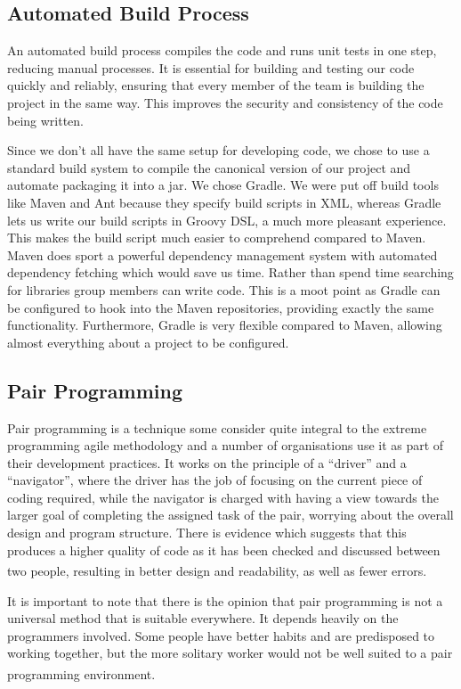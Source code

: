 \documentclass[10pt, a4paper]{article}
\begin{document}
\subsection{Automated Build Process}

An automated build process compiles the code and runs unit tests in one step, reducing manual processes. It is essential for building and testing our code quickly and reliably, ensuring that every member of the team is building the project in the same way. This improves the security and consistency of the code being written. 

Since we don’t all have the same setup for developing code, we chose to use a standard build system to compile the canonical version of our project and automate packaging it into a jar. We chose Gradle. We were put off build tools like Maven and Ant because they specify build scripts in XML, whereas Gradle lets us write our build scripts in Groovy DSL, a much more pleasant experience. This makes the build script much easier to comprehend compared to Maven. Maven does sport a powerful dependency management system with automated dependency fetching which would save us time. Rather than spend time searching for libraries group members can write code. This is a moot point as Gradle can be configured to hook into the Maven repositories, providing exactly the same functionality. Furthermore, Gradle is very flexible compared to Maven, allowing almost everything about a project to be configured. 

\subsection{Pair Programming}

Pair programming is a technique some consider quite integral to the extreme programming agile methodology and a number of organisations use it as part of their development practices. It works on the principle of a “driver” and a “navigator”, where the driver has the job of focusing on the current piece of coding required, while the navigator is charged with having a view towards the larger goal of completing the assigned task of the pair, worrying about the overall design and program structure. There is evidence which suggests that this produces a higher quality of code as it has been checked and discussed between two people, resulting in better design and readability, as well as fewer errors\textsuperscript{\cite{pairprog1a,pairprog1b,pairprog1c,pairprog1d}}.

It is important to note that there is the opinion that pair programming is not a universal method that is suitable everywhere. It depends heavily on the programmers involved. Some people have better habits and are predisposed to working together, but the more solitary worker would not be well suited to a pair programming environment\textsuperscript{\cite{partswap}}.
\end{document}
